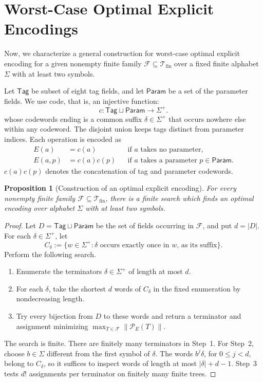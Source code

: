 \documentclass{article}%
\newtheorem{proposition}[theorem]{Proposition}
\theoremstyle{remark}
\theoremstyle{definition}
\theoremstyle{definition}
\theoremstyle{plain}
\begin{document}
\section{Worst-Case Optimal Explicit Encodings}
Now, we characterize a general construction for worst-case optimal explicit
encoding for a given nonempty finite family \(\mathcal
F\subseteq\mathcal{T}_\text{fin}\) over a fixed finite alphabet \(\Sigma\) with at
least two symbols.

Let \(\mathsf{Tag}\) be subset of eight tag fields, and let \(\mathsf{Param}\)
be a set of the parameter fields. We use code, that is, an injective function:
\[
  c\colon \mathsf{Tag}\sqcup\mathsf{Param}\longrightarrow\Sigma^+.
\]
whose codewords ending is a common suffix \(\delta\in\Sigma^+\) that occurs
nowhere else within any codeword. The disjoint union keeps tags distinct from
parameter indices. Each operation is encoded as
\[
  \begin{aligned}
    E(a)   &= c(a)     && \text{if \(a\) takes no parameter},\\
    E(a,p) &= c(a)c(p) && \text{if \(a\) takes a parameter \(p\in\mathsf{Param}\)}.
  \end{aligned}
\]
\(c(a)c(p)\) denotes the concatenation of tag and parameter codewords.

\begin{proposition}[Construction of an optimal explicit encoding]
\label{prop:constructive-minimax-encoding}
For every nonempty finite family \(\mathcal F\subseteq\mathcal{T}_\text{fin}\), there
is a finite search which finds an optimal encoding over alphabet \(\Sigma\) with
at least two symbols.
\end{proposition}
\begin{proof}
Let \(D=\mathsf{Tag}\sqcup\mathsf{Param}\) be the set of fields occurring in
\(\mathcal F\), and put \(d=|D|\). For each \(\delta\in\Sigma^+\), let
\[
  C_\delta := \{w\in\Sigma^+ :
    \text{\(\delta\) occurs exactly once in \(w\), as its suffix}\}.
\]
Perform the following search.
\begin{enumerate}
\item Enumerate the terminators \(\delta\in\Sigma^+\) of length at most \(d\).
\item For each \(\delta\), take the shortest \(d\) words of \(C_\delta\) in the
      fixed enumeration by nondecreasing length.
\item Try every bijection from \(D\) to these words and return a terminator and
      assignment minimizing \(\max_{T\in\mathcal F}\|\mathcal P_E(T)\|\).
\end{enumerate}

The search is finite. There are finitely many terminators in Step~1. For Step~2,
choose \(b\in\Sigma\) different from the first symbol of \(\delta\). The words
\(b^j\delta\), for \(0\leq j<d\), belong to \(C_\delta\), so it suffices to
inspect words of length at most \(|\delta|+d-1\). Step~3 tests \(d!\)
assignments per terminator on finitely many finite trees.
\end{proof}
\end{document}
